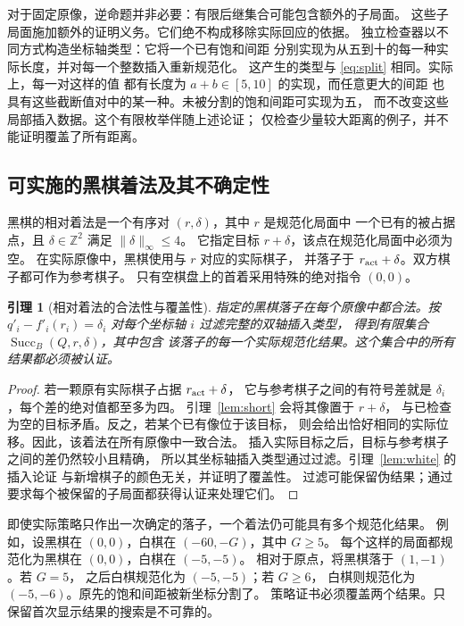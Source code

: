 \documentclass[11pt]{article}
\newtheorem{lemma}[theorem]{引理}
\theoremstyle{definition}
\theoremstyle{remark}
\newcommand{\Z}{\mathbb Z}
\newcommand{\Succ}{\operatorname{Succ}}
\begin{document}
对于固定原像，逆命题并非必要：有限后继集合可能包含额外的子局面。
这些子局面施加额外的证明义务。它们绝不构成移除实际回应的依据。
独立检查器以不同方式构造坐标轴类型：它将一个已有饱和间距
分别实现为从五到十的每一种实际长度，并对每一个整数插入重新规范化。
这产生的类型与 \eqref{eq:split} 相同。实际上，每一对这样的值
都有长度为 $a+b\in[5,10]$ 的实现，而任意更大的间距
也具有这些截断值对中的某一种。未被分割的饱和间距可实现为五，
而不改变这些局部插入数据。这个有限枚举伴随上述论证；
仅检查少量较大距离的例子，并不能证明覆盖了所有距离。

\subsection{可实施的黑棋着法及其不确定性}
黑棋的相对着法是一个有序对 $(r,\delta)$，其中 $r$ 是规范化局面中
一个已有的被占据点，且 $\delta\in\Z^2$ 满足 $\|\delta\|_\infty\leq4$。
它指定目标 $r+\delta$，该点在规范化局面中必须为空。
在实际原像中，黑棋使用与 $r$ 对应的实际棋子，
并落子于 $r_{\rm act}+\delta$。双方棋子都可作为参考棋子。
只有空棋盘上的首着采用特殊的绝对指令 $(0,0)$。

\begin{lemma}[相对着法的合法性与覆盖性]
\label{lem:black}
指定的黑棋落子在每个原像中都合法。按 $q'_i-f'_i(r_i)=\delta_i$
对每个坐标轴 $i$ 过滤完整的双轴插入类型，
得到有限集合 $\Succ_B(Q,r,\delta)$，其中包含
该落子的每一个实际规范化结果。这个集合中的所有结果都必须被认证。
\end{lemma}
\begin{proof}
若一颗原有实际棋子占据 $r_{\rm act}+\delta$，
它与参考棋子之间的有符号差就是 $\delta_i$，每个差的绝对值都至多为四。
引理~\ref{lem:short} 会将其像置于 $r+\delta$，
与已检查为空的目标矛盾。反之，若某个已有像位于该目标，
则会给出恰好相同的实际位移。因此，该着法在所有原像中一致合法。
插入实际目标之后，目标与参考棋子之间的差仍然较小且精确，
所以其坐标轴插入类型通过过滤。引理~\ref{lem:white} 的插入论证
与新增棋子的颜色无关，并证明了覆盖性。
过滤可能保留伪结果；通过要求每个被保留的子局面都获得认证来处理它们。
\end{proof}

即使实际策略只作出一次确定的落子，一个着法仍可能具有多个规范化结果。
例如，设黑棋在 $(0,0)$，白棋在 $(-60,-G)$，其中 $G\geq5$。
每个这样的局面都规范化为黑棋在 $(0,0)$，白棋在 $(-5,-5)$。
相对于原点，将黑棋落于 $(1,-1)$。若 $G=5$，
之后白棋规范化为 $(-5,-5)$；若 $G\geq6$，
白棋则规范化为 $(-5,-6)$。原先的饱和间距被新坐标分割了。
策略证书必须覆盖两个结果。只保留首次显示结果的搜索是不可靠的。
\end{document}
